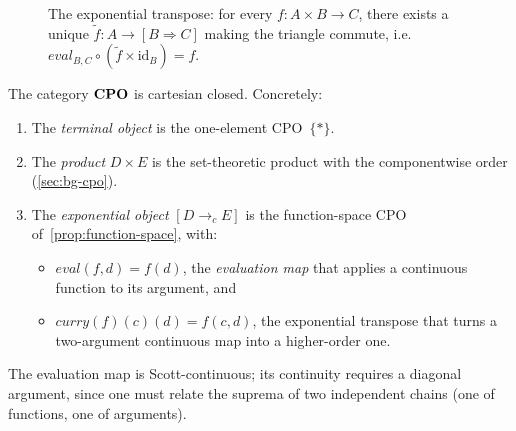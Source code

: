 \begin{figure}[ht]
\centering
{}
\caption{The exponential transpose: for every $f : A \times B \to C$,
  there exists a unique $\widetilde{f} : A \to [B \Rightarrow C]$
  making the triangle commute, i.e.\
  $\mathit{eval}_{B,C} \circ (\widetilde{f} \times \mathrm{id}_B) = f$.}
\label{fig:exponential-transpose}
\end{figure}

\begin{proposition}
\label{prop:cpo-ccc}
The category $\mathbf{CPO}$ is cartesian closed. Concretely:
\begin{enumerate}
  \item The \emph{terminal object} is the one-element CPO~$\{*\}$.
  \item The \emph{product} $D \times E$ is the set-theoretic product
    with the componentwise order (\cref{sec:bg-cpo}).
  \item The \emph{exponential object} $[D \to_c E]$ is the
    function-space CPO of~\cref{prop:function-space}, with:
    \begin{itemize}
      \item $\mathit{eval}(f, d) = f(d)$, the
            \emph{evaluation map} that applies a continuous function
            to its argument, and
      \item $\mathit{curry}(f)(c)(d) = f(c, d)$, the exponential
            transpose that turns a two-argument continuous map into a
            higher-order one.
    \end{itemize}
\end{enumerate}
The evaluation map is Scott-continuous; its continuity requires a
diagonal argument, since one must relate the suprema of two independent
chains (one of functions, one of arguments).
\end{proposition}

